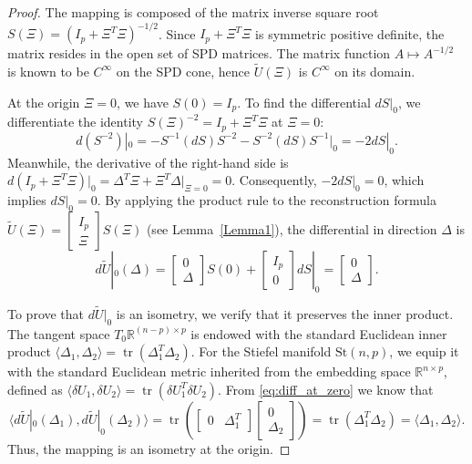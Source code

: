 \documentclass[11pt]{article}
\begin{document}
\begin{proof}
The mapping is composed of the matrix inverse square root $S(\Xi) = (I_p + \Xi^T \Xi)^{-1/2}$. Since $I_p + \Xi^T \Xi$ is symmetric positive definite, the matrix resides in the open set of SPD matrices. The matrix function $A \mapsto A^{-1/2}$ is known to be $C^\infty$ on the SPD cone, hence $\widetilde{U}(\Xi)$ is $C^\infty$ on its domain.

  At the origin $\Xi=0$, we have $S(0) = I_p$. To find the differential $dS|_0$, we differentiate the identity $S(\Xi)^{-2} = I_p + \Xi^T \Xi$ at $\Xi=0$:
\begin{equation}
d(S^{-2})|_0 = -S^{-1}(dS)S^{-2} - S^{-2}(dS)S^{-1} \Big|_0 = -2 dS|_0.
\end{equation}
Meanwhile, the derivative of the right-hand side is $d(I_p + \Xi^T \Xi)|_0 = \Delta^T \Xi + \Xi^T \Delta \big|_{\Xi=0} = 0$. Consequently, $-2 dS|_0 = 0$, which implies $dS|_0 = 0$. 
By applying the product rule to the reconstruction formula   $\widetilde{U}(\Xi) = \begin{bmatrix} I_p \\ \Xi \end{bmatrix} S(\Xi)$ (see Lemma~\ref{Lemma1}), the differential in direction $\Delta$ is
\begin{equation} \label{eq:diff_at_zero}
d\widetilde{U}|_0(\Delta) = \begin{bmatrix} 0 \\ \Delta \end{bmatrix} S(0) + \begin{bmatrix} I_p \\ 0 \end{bmatrix} dS|_0 = \begin{bmatrix} 0 \\ \Delta \end{bmatrix}.
\end{equation}

To prove that $d\widetilde{U}|_0$ is an isometry, we verify that it preserves the inner product. The tangent space $T_0\mathbb{R}^{(n-p)\times p}$ is endowed with the standard Euclidean inner product $\langle \Delta_1, \Delta_2 \rangle = \operatorname{tr}(\Delta_1^T \Delta_2)$. For the Stiefel manifold $\text{St}(n, p)$, we equip it with the standard Euclidean metric inherited from the embedding space $\mathbb{R}^{n \times p}$, defined as $\langle \delta U_1, \delta U_2 \rangle = \operatorname{tr}(\delta U_1^T \delta U_2)$. From \eqref{eq:diff_at_zero} we know that
\begin{equation}
\langle d\widetilde{U}|_0(\Delta_1), d\widetilde{U}|_0(\Delta_2) \rangle = \operatorname{tr}\left( \begin{bmatrix} 0 & \Delta_1^T \end{bmatrix} \begin{bmatrix} 0 \\ \Delta_2 \end{bmatrix} \right) = \operatorname{tr}(\Delta_1^T \Delta_2) = \langle \Delta_1, \Delta_2 \rangle.
\end{equation}
Thus, the mapping is an isometry at the origin.
\end{proof}
\end{document}
